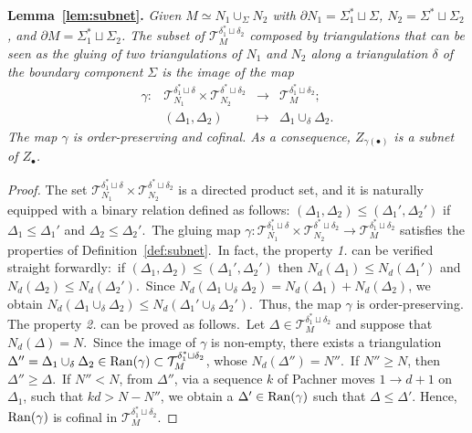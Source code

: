 \documentclass[11pt]{article}
\theoremstyle{definition}
\numberwithin{equation}{section}
\begin{document}
\noindent\textbf{Lemma~\ref{lem:subnet}.}\emph{
    Given $ M\simeq N_1\cup_{\Sigma}N_2$ with $\partial N_1=\Sigma_1^*\sqcup\Sigma$, $N_2=\Sigma^*\sqcup\Sigma_2$, and $\partial  M=\Sigma_1^*\sqcup \Sigma_2$. The subset of $\mathcal{T}_{M}^{\delta_1^* \sqcup \delta_2}$ composed by triangulations that can be seen as the gluing of two triangulations of $N_1$ and $N_2$ along a triangulation $\delta$ of the boundary component $\Sigma$ is the image of the map
    \[
    \begin{matrix}
        \gamma: & \mathcal{T}_{N_1}^{\delta_1^* \sqcup \delta}\times \mathcal{T}_{N_2}^{\delta^* \sqcup \delta_2} & \to & \mathcal{T}_{M}^{\delta_1^* \sqcup \delta_2};\\
        & (\Delta_1,\Delta_2) & \mapsto & \Delta_1\cup_\delta \Delta_2.
    \end{matrix}
    \]
    The map $\gamma$ is order-preserving and cofinal. As a consequence, $Z_{\gamma(\bullet)}$ is a subnet of $Z_{\bullet}$.
}
\begin{proof}
    The set $\mathcal{T}_{N_1}^{\delta_1^* \sqcup \delta}\times \mathcal{T}_{N_2}^{\delta^* \sqcup \delta_2}$ is a directed product set, and it is naturally equipped with a binary relation defined as follows: $(\Delta_1,\Delta_2) \leq (\Delta_1', \Delta_2')$ if $\Delta_1 \leq \Delta_1'$ and $\Delta_2 \leq \Delta_2'$.~The gluing map $\gamma:\mathcal{T}_{N_1}^{\delta_1^* \sqcup \delta}\times \mathcal{T}_{N_2}^{\delta^* \sqcup \delta_2}\to \mathcal{T}_M^{\delta_1^*\sqcup\delta_2}$ satisfies the properties of Definition~\ref{def:subnet}.~In fact, the property \textit{1.} can be verified straight forwardly:~if $(\Delta_1,\Delta_2) \leq (\Delta_1', \Delta_2')$ then $N_d(\Delta_1) \leq N_d(\Delta_1')$ and $N_d(\Delta_2) \leq N_d(\Delta_2')$.~Since $N_d(\Delta_1\cup_\delta\Delta_2)=N_d(\Delta_1)+N_d(\Delta_2)$, we obtain $N_d(\Delta_1\cup_\delta\Delta_2)\leq N_d(\Delta_1'\cup_\delta\Delta_2')$.~Thus, the map $\gamma$ is order-preserving. The property \textit{2.} can be proved as follows.~Let $\Delta \in  \mathcal{T}_M^{\delta_1^*\sqcup\delta_2}$ and suppose that $N_d(\Delta)=N$.~Since the image of $\gamma$ is non-empty, there exists a triangulation $\Delta''=\Delta_1\cup_\delta\Delta_2\in {\rm Ran}(\gamma)\subset  \mathcal{T}_M^{\delta_1^*\sqcup\delta_2}$, whose $N_d(\Delta'')=N''$.~If $N''\geq N$, then $\Delta'' \geq \Delta$.~If $N''< N$, from $\Delta''$, via a sequence $k$ of Pachner moves $1\to d+1$ on $\Delta_1$, such that $kd>N-N''$, we obtain a $\Delta'\in {\rm Ran}(\gamma)$ such that $\Delta \leq \Delta'$. Hence, ${\rm Ran}(\gamma)$ is cofinal in $ \mathcal{T}_M^{\delta_1^*\sqcup\delta_2}$.
\end{proof}
\end{document}
